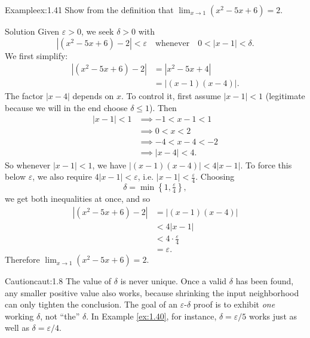 \documentclass[a4paper,12pt,oneside]{memoir}
\begin{document}
\begin{workedexample}
\begin{envexample}{Example}{ex:1.41}{}
Show from the definition that \(\lim_{x \to 1} (x^{2} - 5x + 6) = 2\).
\end{envexample}
\begin{envsolution}{Solution}{}{}
Given \(\varepsilon > 0\), we seek \(\delta > 0\) with \[ |(x^{2} - 5x + 6) - 2| < \varepsilon \quad \text{whenever} \quad 0 < |x - 1| < \delta. \] We first simplify: \[ \begin{aligned} |(x^{2} - 5x + 6) - 2| &= |x^{2} - 5x + 4|\\ &= |(x - 1)(x - 4)|. \end{aligned} \] The factor \(|x - 4|\) depends on \(x\). To control it, first assume \(|x - 1| < 1\) (legitimate because we will in the end choose \(\delta \le 1\)). Then \[ \begin{aligned} |x - 1| < 1 &\implies -1 < x - 1 < 1\\ &\implies 0 < x < 2\\ &\implies -4 < x - 4 < -2\\ &\implies |x - 4| < 4. \end{aligned} \] So whenever \(|x - 1| < 1\), we have \(|(x - 1)(x - 4)| < 4 |x - 1|\). To force this below \(\varepsilon\), we also require \(4 |x - 1| < \varepsilon\), i.e. \(|x - 1| < \tfrac{\varepsilon}{4}\). Choosing \[ \delta = \min\!\left\{1, \tfrac{\varepsilon}{4}\right\}, \] we get both inequalities at once, and so \[ \begin{aligned} |(x^{2} - 5x + 6) - 2| &= |(x - 1)(x - 4)|\\ &< 4 |x - 1|\\ &< 4 \cdot \tfrac{\varepsilon}{4}\\ &= \varepsilon. \end{aligned} \] Therefore \(\lim_{x \to 1} (x^{2} - 5x + 6) = 2\).
\end{envsolution}
\end{workedexample}
\begin{envcaution}{Caution}{caut:1.8}{}
The value of \(\delta\) is never unique. Once a valid \(\delta\) has been found, any smaller positive value also works, because shrinking the input neighborhood can only tighten the conclusion. The goal of an \(\varepsilon\text{-}\delta\) proof is to exhibit \emph{one} working \(\delta\), not “the” \(\delta\). In Example \ref{ex:1.40}, for instance, \(\delta = \varepsilon/5\) works just as well as \(\delta = \varepsilon/4\).
\end{envcaution}
\end{document}
